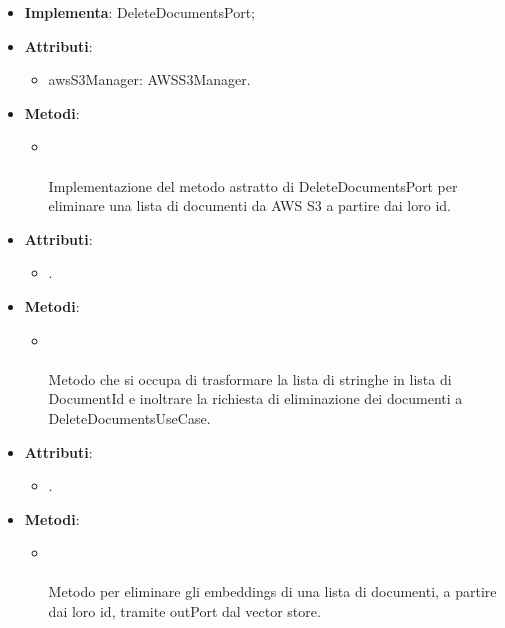 \documentclass[10pt, a4paper]{article}
\begin{document}
\label{DeleteDocumentsAWSS3Dettaglio}
\begin{itemize}
    \item \textbf{Implementa}: DeleteDocumentsPort;
    \item \textbf{Attributi}:
    \begin{itemize}
        \item awsS3Manager: AWSS3Manager.
    \end{itemize}
    \item \textbf{Metodi}:
    \begin{itemize}
        \item {}\\ \\
        Implementazione del metodo astratto di DeleteDocumentsPort per eliminare una lista di documenti da AWS S3 a partire dai loro id.
    \end{itemize}
\end{itemize}


\label{DeleteDocumentsControllerDettaglio}
\begin{itemize}
    \item \textbf{Attributi}:
    \begin{itemize}
        \item {}.
    \end{itemize}
    \item \textbf{Metodi}:
    \begin{itemize}
        \item {}\\ \\
        Metodo che si occupa di trasformare la lista di stringhe in lista di DocumentId e inoltrare la richiesta di eliminazione dei documenti a DeleteDocumentsUseCase.
    \end{itemize}
\end{itemize}

\label{DeleteDocumentsEmbeddingsDettaglio}
\begin{itemize}
    \item \textbf{Attributi}:
    \begin{itemize}
        \item {}. 
    \end{itemize}
    \item \textbf{Metodi}:
    \begin{itemize}
        \item {}\\ \\
        Metodo per eliminare gli embeddings di una lista di documenti, a partire dai loro id, tramite outPort dal vector store.
    \end{itemize}
\end{itemize}
\end{document}

